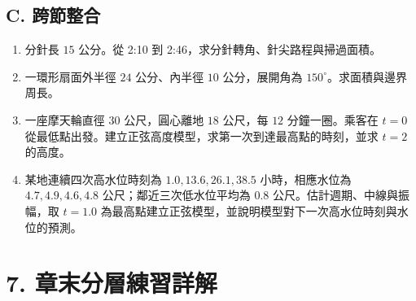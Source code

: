 \documentclass[11pt,a4paper]{article}
\providecommand{\tightlist}{%
  \setlength{\itemsep}{0pt}\setlength{\parskip}{0pt}}
\begin{document}
\subsection{C. 跨節整合}\label{c.-ux8de8ux7bc0ux6574ux5408}

\begin{enumerate}
\def\labelenumi{\arabic{enumi}.}
\setcounter{enumi}{12}
\tightlist
\item
  分針長 \(15\) 公分。從 2:10 到 2:46，求分針轉角、針尖路程與掃過面積。
\item
  一環形扇面外半徑 \(24\) 公分、內半徑 \(10\) 公分，展開角為 \(150^\circ\)。求面積與邊界周長。
\item
  一座摩天輪直徑 \(30\) 公尺，圓心離地 \(18\) 公尺，每 \(12\) 分鐘一圈。乘客在 \(t=0\) 從最低點出發。建立正弦高度模型，求第一次到達最高點的時刻，並求 \(t=2\) 的高度。
\item
  某地連續四次高水位時刻為 \(1.0,13.6,26.1,38.5\) 小時，相應水位為 \(4.7,4.9,4.6,4.8\) 公尺；鄰近三次低水位平均為 \(0.8\) 公尺。估計週期、中線與振幅，取 \(t=1.0\) 為最高點建立正弦模型，並說明模型對下一次高水位時刻與水位的預測。
\end{enumerate}

\section{7. 章末分層練習詳解}\label{ux7ae0ux672bux5206ux5c64ux7df4ux7fd2ux8a73ux89e3}
\end{document}

